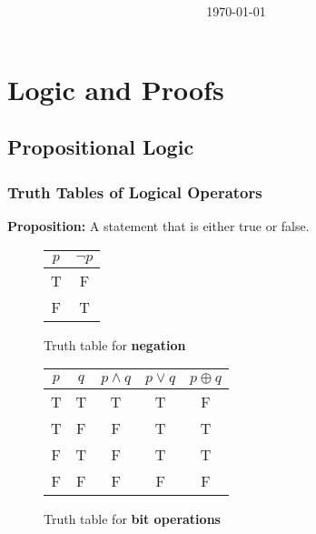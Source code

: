 \documentclass[article, 11pt]{article}
\title{
    \vspace{2in}
    \textmd{\textbf{\studyTitle}}
    \normalsize\vspace{0.1in}\\
    \vspace{0.1in}\large{\text{\class: \professor}}
    \vspace{3in}
}
\author{\name}
\date{\today}
\newcommand{\xor}{\oplus} %
\begin{document}
    \maketitle
    \thispagestyle{empty}
    \pagebreak
    \tableofcontents
    \pagebreak
    
    \section{Logic and Proofs}  
    \subsection{Propositional Logic}
    \subsubsection{Truth Tables of Logical Operators}
    \textbf{Proposition:} A statement that is either true or false.
    \begin{figure}[H]
        \centering
            \begin{tabular}{c|c}
                $p$ & $\neg p$ \\
                \hline
                T & F \\
                F & T
            \end{tabular}
        \caption{Truth table for \textbf{negation}}
    \end{figure}
    \begin{figure}[H]
        \centering
            \begin{tabular}{c|c|c|c|c}
                $p$ & $q$ & $p \land q$ & $p \lor q$ & $p \xor q$ \\
                \hline
                T & T & T & T & F \\
                T & F & F & T & T \\
                F & T & F & T & T \\
                F & F & F & F & F
            \end{tabular}
        \caption{Truth table for \textbf{bit operations}}
    \end{figure}
\end{document}
